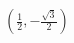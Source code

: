 \documentclass[preview]{standalone}
\begin{document}
\begin{align*}
\left(\frac{1}{2}, -\frac{\sqrt{3}}{2}\right)
\end{align*}
\end{document}
